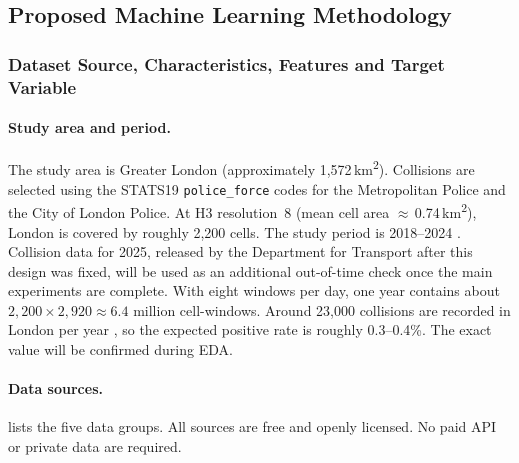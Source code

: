 \subsection{Proposed Machine Learning Methodology}
\label{sec:methodology}

\subsubsection{Dataset Source, Characteristics, Features and Target Variable}
\label{sec:dataset}

\paragraph{Study area and period.}
The study area is Greater London (approximately 1,572\,km\textsuperscript{2}). Collisions are selected using the STATS19 \texttt{police\_force} codes for the Metropolitan Police and the City of London Police. At H3 resolution~8 (mean cell area $\approx$\,0.74\,km\textsuperscript{2}), London is covered by roughly 2,200 cells. The study period is 2018--2024 \cite{dft2025roadsafetydata}. Collision data for 2025, released by the Department for Transport after this design was fixed, will be used as an additional out-of-time check once the main experiments are complete. With eight windows per day, one year contains about $2{,}200 \times 2{,}920 \approx 6.4$ million cell-windows. Around 23,000 collisions are recorded in London per year \cite{tfl2024casualties}, so the expected positive rate is roughly 0.3--0.4\%. The exact value will be confirmed during EDA.

\paragraph{Data sources.}
 lists the five data groups. All sources are free and openly licensed. No paid API or private data are required.

